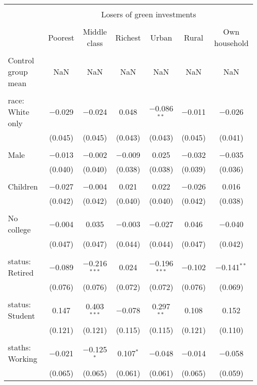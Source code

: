 
\begin{tabular}{@{\extracolsep{5pt}}lcccccc} 
\\[-1.8ex]\hline 
\hline \\[-1.8ex] 
 & \multicolumn{6}{c}{Losers of green investments} \\ 
\cline{2-7} 
\\[-1.8ex] & Poorest & Middle class & Richest & Urban & Rural & Own household \\ 
\hline \\[-1.8ex] 
 Control group mean & NaN & NaN & NaN & NaN & NaN & NaN  \\ \hline \\[-1.8ex] race: White only & $-$0.029 & $-$0.024 & 0.048 & $-$0.086$^{**}$ & $-$0.011 & $-$0.026 \\ 
  & (0.045) & (0.045) & (0.043) & (0.043) & (0.045) & (0.041) \\ 
  & & & & & & \\ 
 Male & $-$0.013 & $-$0.002 & $-$0.009 & 0.025 & $-$0.032 & $-$0.035 \\ 
  & (0.040) & (0.040) & (0.038) & (0.038) & (0.039) & (0.036) \\ 
  & & & & & & \\ 
 Children & $-$0.027 & $-$0.004 & 0.021 & 0.022 & $-$0.026 & 0.016 \\ 
  & (0.042) & (0.042) & (0.040) & (0.040) & (0.042) & (0.038) \\ 
  & & & & & & \\ 
 No college & $-$0.004 & 0.035 & $-$0.003 & $-$0.027 & 0.046 & $-$0.040 \\ 
  & (0.047) & (0.047) & (0.044) & (0.044) & (0.047) & (0.042) \\ 
  & & & & & & \\ 
 status: Retired & $-$0.089 & $-$0.216$^{***}$ & 0.024 & $-$0.196$^{***}$ & $-$0.102 & $-$0.141$^{**}$ \\ 
  & (0.076) & (0.076) & (0.072) & (0.072) & (0.076) & (0.069) \\ 
  & & & & & & \\ 
 status: Student & 0.147 & 0.403$^{***}$ & $-$0.078 & 0.297$^{**}$ & 0.108 & 0.152 \\ 
  & (0.121) & (0.121) & (0.115) & (0.115) & (0.121) & (0.110) \\ 
  & & & & & & \\ 
 staths: Working & $-$0.021 & $-$0.125$^{*}$ & 0.107$^{*}$ & $-$0.048 & $-$0.014 & $-$0.058 \\ 
  & (0.065) & (0.065) & (0.061) & (0.061) & (0.065) & (0.059) \\ 

\end{tabular}
